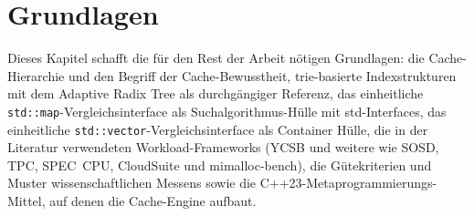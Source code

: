 \chapter{Grundlagen}\label{ch:fundamentals}
Dieses Kapitel schafft die für den Rest der Arbeit nötigen Grundlagen: die Cache-Hierarchie und den
Begriff der Cache-Bewusstheit, trie-basierte Indexstrukturen mit dem Adaptive Radix Tree als
durchgängiger Referenz, das einheitliche \texttt{std::map}-Vergleichsinterface als
Suchalgorithmus-Hülle mit std-Interfaces, das einheitliche \texttt{std::vector}-Vergleichsinterface
als Container Hülle, die in der Literatur verwendeten Workload-Frameworks (YCSB und weitere wie
SOSD, TPC, SPEC~CPU, CloudSuite und mimalloc-bench), die Gütekriterien und Muster wissenschaftlichen
Messens sowie die C++23-Metaprogrammierungs-Mittel, auf denen die Cache-Engine aufbaut.

